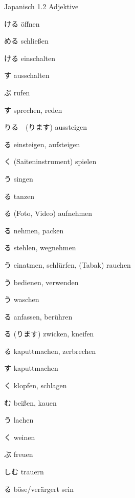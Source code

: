 \begin{multicols*}{2}
\begin{flushleft}
\begin{labeling}{Japanisch 1.2 Adjektive}
	\item [\ruby{開}{あ}ける] öffnen
	\item [\ruby{閉}{し}める] schließen
	\item [\ruby{点}{つ}ける] einschalten
	\item [\ruby{消}{け}す] ausschalten
	
	\item [\ruby{呼}{よ}ぶ] rufen
	\item [\ruby{話}{はな}す] sprechen, reden
	
	\item [\ruby{降}{お}りる　(\ruby{降}{お}ります)] aussteigen
	\item [\ruby{乗}{の}る] einsteigen, aufsteigen
	
	\item [\ruby{弾}{ひ}く] (Saiteninstrument) spielen
	\item [\ruby{歌}{うた}う] singen
	\item [\ruby{踊}{おど}る] tanzen
	
	\item [\ruby{撮}{と}る] (Foto, Video) aufnehmen
	\item [\ruby{取}{と}る] nehmen, packen
	\item [\ruby{盗}{と}る] stehlen, wegnehmen
	
	\item [\ruby{吸}{す}う] einatmen, schlürfen, (Tabak) rauchen
	\item [\ruby{使}{つか}う] bedienen, verwenden
	\item [\ruby{洗}{あら}う] waschen
	
	\item [\ruby{触}{さわ}る] anfassen, berühren
	\item [\ruby{抓}{つね}る (\ruby{抓}{つね}ります)] zwicken, kneifen
	\item [\ruby{割}{わ}る] kaputtmachen, zerbrechen
	\item [\ruby{毀}{こわ}す] kaputtmachen
	\item [\ruby{叩}{たた}く] klopfen, schlagen
	\item [\ruby{噛}{か}む] beißen, kauen
	
	\item [\ruby{笑}{わら}う] lachen
	\item [\ruby{泣}{な}く] weinen
	\item [\ruby{喜}{よろこ}ぶ] freuen
	\item [\ruby{悲}{かな}しむ] trauern
	\item [\ruby{怒}{おこ}る] böse/verärgert sein
	

\end{labeling}
\end{flushleft}
\end{multicols*}
